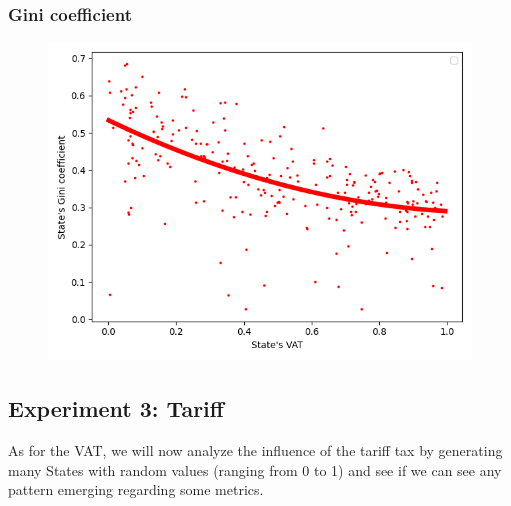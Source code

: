         { \lipsum[1-2] %
        \par

        \subsubsection{Gini coefficient}

        \begin{figure}
            \includegraphics[width=\linewidth]{img/exp/2_3.png}
        \end{figure} 
        { \lipsum[1-2] %
        \par

    \subsection{Experiment 3: Tariff}
    As for the VAT, we will now analyze the influence of the tariff tax by generating many States with random values (ranging from 0 to 1) and see if we can see any pattern emerging regarding some metrics. 

}}
